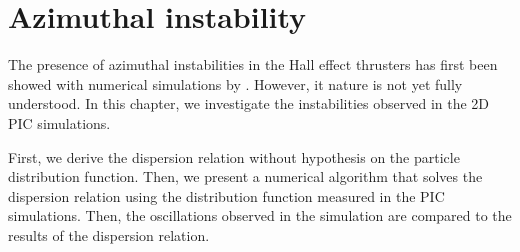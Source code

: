 



\chapter{Azimuthal instability}
\label{ch-3}

The presence of azimuthal instabilities in the Hall effect thrusters has first been showed with numerical simulations by \citet{adam2004}.
However, it nature is not yet fully understood.
In this chapter, we investigate the instabilities observed in the \ac{2D} \ac{PIC} simulations.

First, we derive the dispersion relation without hypothesis on the particle distribution function.
Then, we present a numerical algorithm that solves the dispersion relation using the distribution function measured in the \ac{PIC} simulations.
Then, the oscillations observed in the simulation are compared to the results of the dispersion relation.

% 
% 

\minitoc






